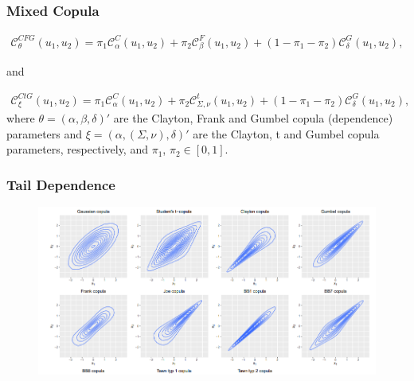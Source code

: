 \documentclass[pdf,9pt,xcolor=dvipsnames,hide notes]{beamer}
\begin{document}
\begin{frame}[label=frame4i]
\frametitle{Mixed Copula}

\begin{eqnarray*}
	\mathcal{C}_{\theta}^{CFG}\left(u_{1},u_{2}\right)=\pi_{1}\mathcal{C}_{\alpha}^{C}\left(u_{1},u_{2}\right)+\pi_{2}\mathcal{C}_{\beta}^{F}\left(u_{1},u_{2}\right)+\left(1-\pi_{1}-\pi_{2}\right)\mathcal{C}_{\delta}^{G}\left(u_{1},u_{2}\right),
\end{eqnarray*}

and

\begin{eqnarray*}
	\mathcal{C}_{\xi}^{CtG}\left(u_{1},u_{2}\right)=\pi_{1}\mathcal{C}_{\alpha}^{C}\left(u_{1},u_{2}\right)+\pi_{2}\mathcal{C}_{\Sigma,\nu}^{t}\left(u_{1},u_{2}\right)+\left(1-\pi_{1}-\pi_{2}\right)\mathcal{C}_{\delta}^{G}\left(u_{1},u_{2}\right),
\end{eqnarray*}
where $\theta=\left(\alpha,\beta,\delta\right)'$ are the Clayton, Frank and Gumbel copula (dependence) parameters and $\xi=\left(\alpha,(\Sigma,\nu),\delta\right)'$ are the Clayton, t and Gumbel copula parameters, respectively, and $\pi_{1}$, $\pi_{2} \in [0,1]$. 

\end{frame}

\begin{frame}
\frametitle{Tail Dependence}

\begin{figure}[htbp]
	\centering
	\includegraphics[scale=0.5]{taildep.png}
	\label{fig:fig1}
\end{figure}

\end{frame}
\end{document}
